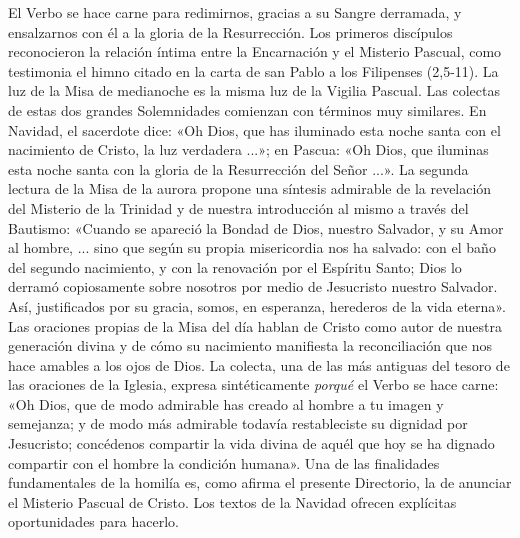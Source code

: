 \documentclass[]{article}
\begin{document}
El Verbo se hace carne para redimirnos, gracias a su Sangre derramada, y
ensalzarnos con él a la gloria de la Resurrección. Los primeros
discípulos reconocieron la relación íntima entre la Encarnación y el
Misterio Pascual, como testimonia el himno citado en la carta de san
Pablo a los Filipenses (2,5-11). La luz de la Misa de medianoche es la
misma luz de la Vigilia Pascual. Las colectas de estas dos grandes
Solemnidades comienzan con términos muy similares. En Navidad, el
sacerdote dice: «Oh Dios, que has iluminado esta noche santa con el
nacimiento de Cristo, la luz verdadera ...»; en Pascua: «Oh Dios, que
iluminas esta noche santa con la gloria de la Resurrección del Señor
...». La segunda lectura de la Misa de la aurora propone una síntesis
admirable de la revelación del Misterio de la Trinidad y de nuestra
introducción al mismo a través del Bautismo: «Cuando se apareció la
Bondad de Dios, nuestro Salvador, y su Amor al hombre, ... sino que
según su propia misericordia nos ha salvado: con el baño del segundo
nacimiento, y con la renovación por el Espíritu Santo; Dios lo derramó
copiosamente sobre nosotros por medio de Jesucristo nuestro Salvador.
Así, justificados por su gracia, somos, en esperanza, herederos de la
vida eterna». Las oraciones propias de la Misa del día hablan de Cristo
como autor de nuestra generación divina y de cómo su nacimiento
manifiesta la reconciliación que nos hace amables a los ojos de Dios. La
colecta, una de las más antiguas del tesoro de las oraciones de la
Iglesia, expresa sintéticamente \emph{porqué} el Verbo se hace carne:
«Oh Dios, que de modo admirable has creado al hombre a tu imagen y
semejanza; y de modo más admirable todavía restableciste su dignidad por
Jesucristo; concédenos compartir la vida divina de aquél que hoy se ha
dignado compartir con el hombre la condición humana». Una de las
finalidades fundamentales de la homilía es, como afirma el presente
Directorio, la de anunciar el Misterio Pascual de Cristo. Los textos de
la Navidad ofrecen explícitas oportunidades para hacerlo.
\end{document}
